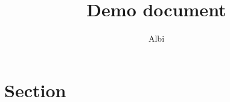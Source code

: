\documentclass[12pt, a4paper]{article}
\title{Demo document}
\author{Albi}
\begin{document}
\maketitle

\section{Section}
\end{document}
